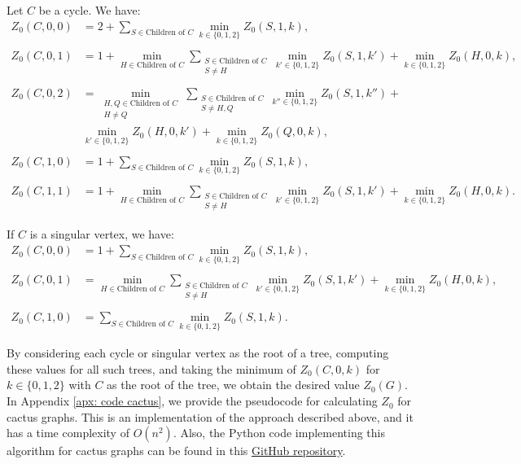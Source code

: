 \documentclass[11pt]{article}
\theoremstyle{plain}
\theoremstyle{definition}
\theoremstyle{remark}
\begin{document}
Let $ C $ be a cycle. We have:
\begin{align*}
 Z_0(C,0,0) &= 2 + \sum_{S \in \text{Children of } C} \min_{k \in \{0,1,2\}} Z_0(S, 1 , k), \\\\
 Z_0(C,0,1) &= 1 + \min_{H \in \text{Children of } C}  \sum_{\substack{S \in \text{Children of } C \\ S \neq H}} \min_{k' \in \{0,1,2\}} Z_0(S, 1 , k') + \min_{k \in \{0,1,2\}} Z_0(H, 0 , k), \\\\
 Z_0(C,0,2) &= \min_{\substack{H , Q \in \text{Children of } C \\ H \neq Q}}\sum_{\substack{S \in \text{Children of } C \\ S \neq H , Q}} \min_{k'' \in \{0,1,2\}} Z_0(S, 1 , k'') + \\
 &\min_{k' \in \{0,1,2\}} Z_0(H, 0 , k') + \min_{k \in \{0,1,2\}} Z_0(Q, 0 , k), \\\\
 Z_0(C,1,0) &= 1 + \sum_{S \in \text{Children of } C} \min_{k \in \{0,1,2\}} Z_0(S, 1 , k), \\\\
 Z_0(C,1,1) &= 1 + \min_{H \in \text{Children of } C} \sum_{\substack{S \in \text{Children of } C \\ S \neq H}} \min_{k' \in \{0,1,2\}} Z_0(S, 1 , k') + \min_{k \in \{0,1,2\}} Z_0(H, 0 , k).
 \end{align*}

If $ C $ is a singular vertex, we have:
\begin{align*}
 Z_0(C,0,0) &= 1 + \sum_{S \in \text{Children of } C} \min_{k \in \{0,1,2\}} Z_0(S, 1 , k), \\\\
 Z_0(C,0,1) &= \min_{H \in \text{Children of } C}  \sum_{\substack{S \in \text{Children of } C \\ S \neq H}} \min_{k' \in \{0,1,2\}} Z_0(S, 1 , k') + \min_{k \in \{0,1,2\}} Z_0(H, 0 , k), \\\\
 Z_0(C,1,0) &= \sum_{S \in \text{Children of } C} \min_{k \in \{0,1,2\}} Z_0(S, 1 , k).
 \end{align*}
 \medskip

By considering each cycle or singular vertex as the root of a tree, computing these values for all such trees, and taking the minimum of $Z_0(C, 0, k)$ for $k \in \{0,1,2\}$ with $C$ as the root of the tree, we obtain the desired value $Z_0(G)$.
In Appendix \ref{apx: code cactus}, we provide the pseudocode for calculating $Z_0$ for cactus graphs. This is an implementation of the approach described above, and it has a time complexity of $O(n^2)$. Also, the Python code implementing this algorithm for cactus graphs can be found in this \href{https://github.com/sanazmgh/Zq-Forcing-Number-Algorithms}{GitHub repository}.
\end{document}
